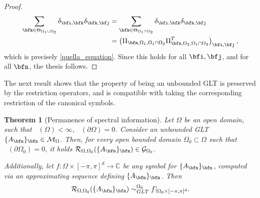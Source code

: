 \documentclass{amsart}
\newtheorem{thm}{Theorem}[section]
\DeclareMathOperator{\Ld}{\mathcal{L}^d}
\begin{document}
\begin{proof}
    \begin{align*}
        \sum_{\bfk\in\Theta_{\Omega_1\cup\Omega_2}}\delta_{\bfi,\bfk}\delta_{\bfk,\bfj}&=\sum_{\bfk\in\Theta_{\Omega_1\cap\Omega_2}}\delta_{\bfi,\bfk}\delta_{\bfk,\bfj}\\
        &=\left(\Pi_{\bfn,\Omega_1,\Omega_1\cap\Omega_2}\Pi_{\bfn,\Omega_2,\Omega_1\cap\Omega_2}^T\right)_{\bfi,\bfj},
    \end{align*}
    which is precisely \eqref{quella_equation}. Since this holds for all $\bfi,\bfj$, and for all $\bfn$, the thesis follows.
\end{proof}

The next result shows that the property of being an unbounded GLT is preserved by the restriction operators, and is compatible with taking the corresponding restriction of the canonical symbols.
\begin{thm}[Permanence of spectral information]\label{perm_spectr_info}
    Let $\Omega$ be an open domain, such that $\Ld(\Omega)<\infty$, $\Ld(\partial\Omega)=0$. Consider an unbounded GLT $\{A_\bfn\}_\bfn\in\mathcal{M}_\Omega$. Then, for every open bounded domain $\Omega_0\subset\Omega$ such that $\Ld(\partial\Omega_0)=0$, it holds $\mathcal{R}_{\Omega,\Omega_0}(\{A_\bfn\}_\bfn)\in\mathcal{G}_{\Omega_0}$.
    
    Additionally, let $f:\Omega\times[-\pi,\pi]^d\to\mathbb{C}$ be any symbol for $\{A_\bfn\}_\bfn$, computed via an approximating sequence defining $\{A_\bfn\}_\bfn$. Then
    \begin{equation*}
        \mathcal{R}_{\Omega,\Omega_0}(\{A_\bfn\}_\bfn)\sim_{GLT}^{\Omega_0}f|_{\Omega_0\times[-\pi,\pi]^d}.
    \end{equation*}
\end{thm}
\end{document}
